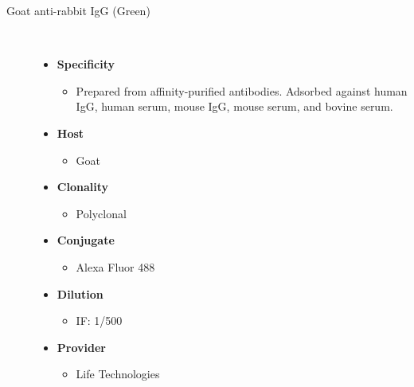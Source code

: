 \begin{description}
\item[Goat anti-rabbit IgG (Green)]~\par
 \begin{itemize}
      \item[] \textbf{Specificity}
      \begin{itemize}
         \item[]Prepared from affinity-purified antibodies. Adsorbed against human IgG, human serum, mouse IgG, mouse serum, and bovine serum.  
      \end{itemize}
      \item[] \textbf{Host}
      \begin{itemize}
      \item[] Goat
      \end{itemize}
            \item[] \textbf{Clonality}
      \begin{itemize}
      \item[] Polyclonal
      \end{itemize}
            \item[] \textbf{Conjugate}
      \begin{itemize}
      \item[]Alexa Fluor\textsuperscript{\textregistered} 488
      \end{itemize}
                  \item[] \textbf{Dilution}
      \begin{itemize}
      \item[]IF: 1/500 
      \end{itemize}       
                  \item[] \textbf{Provider}
      \begin{itemize}
      \item[] Life Technologies
      \end{itemize}     
   \end{itemize}   


\end{description}
